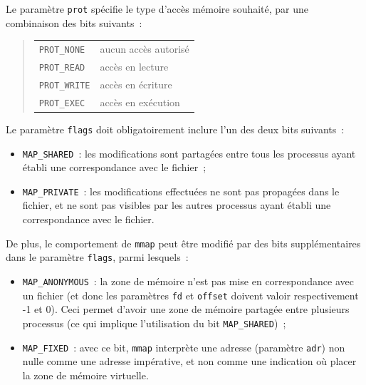\documentclass [twoside] {report}
\begin{document}
Le paramètre \texttt {prot} spécifie le type d'accès mémoire
souhaité, par une combinaison des bits suivants~:

\begin {quote}
    \begin {tabular} {|ll|} \hline
	\texttt {PROT\_NONE} & aucun accès autorisé \\
	\texttt {PROT\_READ} & accès en lecture \\
	\texttt {PROT\_WRITE} & accès en écriture \\
	\texttt {PROT\_EXEC} & accès en exécution \\
	\hline
    \end {tabular}
\end {quote}

Le paramètre \texttt {flags} doit obligatoirement inclure l'un des deux
bits suivants~:

\begin {itemize}
    \item \texttt {MAP\_SHARED}~: les modifications sont partagées entre
	tous les processus ayant établi une correspondance avec le
	fichier~;
    \item \texttt {MAP\_PRIVATE}~: les modifications effectuées ne sont
	pas propagées dans le fichier, et ne sont pas visibles par les
	autres processus ayant établi une correspondance avec le fichier.

\end {itemize}

De plus, le comportement de \texttt {mmap} peut être modifié par des
bits supplémentaires dans le paramètre \texttt {flags}, parmi lesquels~:

\begin {itemize}
    \item \texttt {MAP\_ANONYMOUS}~: la zone de mémoire n'est pas mise
	en correspondance avec un fichier (et donc les paramètres
	\texttt {fd} et \texttt {offset} doivent valoir respectivement
	-1 et 0).  Ceci permet d'avoir une zone de mémoire partagée
	entre plusieurs processus (ce qui implique l'utilisation du bit
	\texttt {MAP\_SHARED})~;

    \item \texttt {MAP\_FIXED}~: avec ce bit, \texttt {mmap} interprète
	une adresse (paramètre \texttt {adr}) non nulle comme une
	adresse impérative, et non comme une indication où placer la
	zone de mémoire virtuelle.

\end {itemize}
\end{document}
